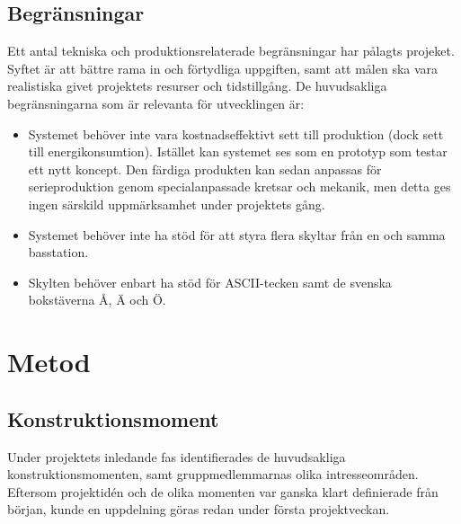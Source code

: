 \documentclass[a4paper,11pt]{article}
\begin{document}
\subsection{Begränsningar}
Ett antal tekniska och produktionsrelaterade begränsningar har pålagts projeket. Syftet är att bättre rama in och förtydliga uppgiften, samt att målen ska vara realistiska givet projektets resurser och tidstillgång. De huvudsakliga begränsningarna som är relevanta för utvecklingen är:
	\begin{itemize}
    	\item Systemet behöver inte vara kostnadseffektivt sett till produktion (dock sett till energikonsumtion). Istället kan systemet ses som en prototyp som testar ett nytt koncept. Den färdiga produkten kan sedan anpassas för serieproduktion genom specialanpassade kretsar och mekanik, men detta ges ingen särskild uppmärksamhet under projektets gång.
    	\item Systemet behöver inte ha stöd för att styra flera skyltar från en och samma basstation.
    	\item Skylten behöver enbart ha stöd för ASCII-tecken samt de svenska bokstäverna Å, Ä och Ö.
	\end{itemize}
	
\section{Metod}

\subsection{Konstruktionsmoment}	
Under projektets inledande fas identifierades de huvudsakliga konstruktionsmomenten, samt gruppmedlemmarnas olika intresseområden. Eftersom projektidén och de olika momenten var ganska klart definierade från början, kunde en uppdelning göras redan under första projektveckan.
\end{document}
